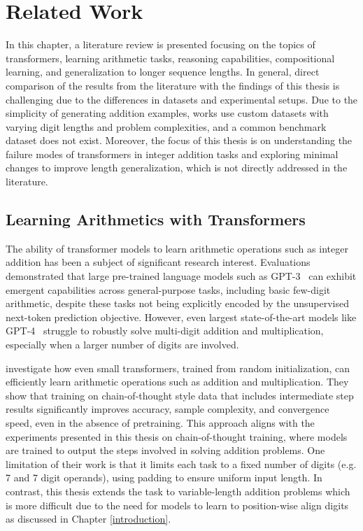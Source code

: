 \chapter{Related Work}\label{related_work}

In this chapter, a literature review is presented focusing on the topics of transformers, learning arithmetic tasks, reasoning capabilities, compositional learning, and generalization to longer sequence lengths. In general, direct comparison of the results from the literature with the findings of this thesis is challenging due to the differences in datasets and experimental setups. Due to the simplicity of generating addition examples, works use custom datasets with varying digit lengths and problem complexities, and a common benchmark dataset does not exist. Moreover, the focus of this thesis is on understanding the failure modes of transformers in integer addition tasks and exploring minimal changes to improve length generalization, which is not directly addressed in the literature.

\section{Learning Arithmetics with Transformers}\label{sec:sota_arithmetic_tasks}

The ability of transformer models \parencite{vaswani_attention_2017} to learn arithmetic operations such as integer addition has been a subject of significant research interest. Evaluations demonstrated that large pre-trained language models such as \mbox{GPT-3}~\parencite{brown_language_2020} can exhibit emergent capabilities across general-purpose tasks, including basic few-digit arithmetic, despite these tasks not being explicitly encoded by the unsupervised next-token prediction objective. However, even largest state-of-the-art models like GPT-4~\parencite{achiam_gpt-4_2023} struggle to robustly solve multi-digit addition and multiplication, especially when a larger number of digits are involved.

\cite{lee_teaching_2023} investigate how even small transformers, trained from random initialization, can efficiently learn arithmetic operations such as addition and multiplication. They show that training on chain-of-thought style data that includes intermediate step results significantly improves accuracy, sample complexity, and convergence speed, even in the absence of pretraining. This approach aligns with the experiments presented in this thesis on chain-of-thought training, where models are trained to output the steps involved in solving addition problems. One limitation of their work is that it limits each task to a fixed number of digits (e.g. 7 and 7 digit operands), using padding to ensure uniform input length. In contrast, this thesis extends the task to variable-length addition problems which is more difficult due to the need for models to learn to position-wise align digits as discussed in Chapter \ref{introduction}.

